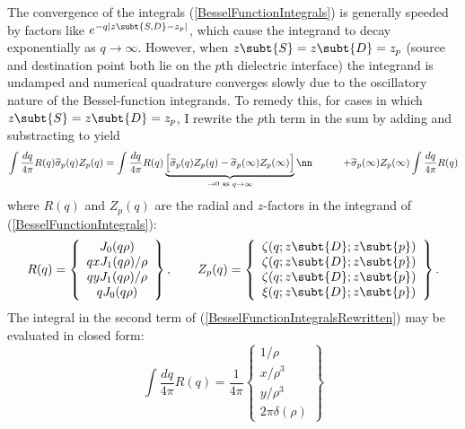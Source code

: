 \documentclass[letterpaper]{article}
\renewcommand{\wt}{\widetilde}
\begin{document}
The convergence of the integrals (\ref{BesselFunctionIntegrals})
is generally speeded by factors like $e^{-q|z\subt{S,D}-z_p|}$,
which cause the integrand to decay exponentially as $q\to\infty$.
However, when $z\subt{S}=z\subt{D}=z_p$ (source and destination
point both lie on the $p$th dielectric interface) the integrand is
undamped and numerical quadrature converges slowly due to
the oscillatory nature of the Bessel-function integrands.
To remedy this, for cases in which $z\subt{S}=z\subt{D}=z_p$,
I rewrite the $p$th term in the sum by adding and substracting
to yield
\begin{align}
 \int \frac{dq}{4\pi} R(q)
 \wt\sigma_p(q) Z_p(q)
&= 
 \int \frac{dq}{4\pi} R(q)
 \underbrace{
 \Big[\wt \sigma_p(q)Z_p(q) - \wt \sigma_p(\infty)Z_p(\infty)\Big]
            }_{\to 0 \text{ as } q\to \infty}
\nn
&\qquad + \wt\sigma_p(\infty)Z_p(\infty)
  \int \frac{dq}{4\pi} R(q)
\label{BesselFunctionIntegralsRewritten}
\end{align}
where $R(q)$ and $Z_p(q)$ are the radial and $z$-factors in
the integrand of (\ref{BesselFunctionIntegrals}):
$$R(q)=
   \left\{ 
     \begin{array}{c}
        J_0(q\rho)       \\ 
      qxJ_1(q\rho)/\rho  \\
      qyJ_1(q\rho)/\rho  \\
      qJ_0(q\rho)
     \end{array}
   \right\}, 
 \qquad 
  Z_p(q)=
   \left\{ 
     \begin{array}{c}
      \zeta(q;z\subt{D};z\subt{p}) \\
      \zeta(q;z\subt{D};z\subt{p}) \\
      \zeta(q;z\subt{D};z\subt{p}) \\
      \xi(q;z\subt{D};z\subt{p})
     \end{array}
   \right\}.
$$
The integral in the second
term of (\ref{BesselFunctionIntegralsRewritten}) may be
evaluated in closed form:
$$ \int \frac{dq}{4\pi} R(q)
   = \frac{1}{4\pi}
     \left\{\begin{array}{c}
         1/\rho   \\
         x/\rho^3 \\
         y/\rho^3 \\
         2\pi\delta(\rho)
     \end{array}\right\}
$$
\end{document}
